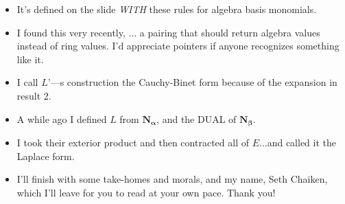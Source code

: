 \documentclass[14pt]{extarticle}
\begin{document}
{\begin{itemize}
\item
It's defined on the slide \emph{WITH} these rules for algebra basis monomials.

\item
  I found this very recently, ... a pairing that should return algebra values
  instead of ring values.  I'd appreciate pointers if anyone recognizes
  something like it.

\item
I call $L$'---s construction the Cauchy-Binet form because of the expansion in result 2.

\item
A while ago I defined $L$ from $\mathbf{N_\alpha}$, and the DUAL of $\mathbf{N_\beta}$.

\item
I took their exterior product and then contracted all of $E$...and called it the
Laplace form.

\item
  I'll finish with some take-homes and morals, and my name, Seth Chaiken, which
  I'll leave for you to read at your own pace.  Thank you!
  \end{itemize}
}
\end{document}
